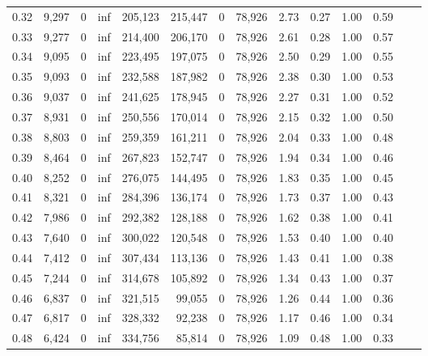 \begin{tabular}{rrrrrrrrrrrrrr}
0.32 &  9,297 &      0 &      inf &  205,123 &  215,447 &       0 &  78,926 &  2.73 &  0.27 &  1.00 &      0.59 \\
0.33 &  9,277 &      0 &      inf &  214,400 &  206,170 &       0 &  78,926 &  2.61 &  0.28 &  1.00 &      0.57 \\
0.34 &  9,095 &      0 &      inf &  223,495 &  197,075 &       0 &  78,926 &  2.50 &  0.29 &  1.00 &      0.55 \\
0.35 &  9,093 &      0 &      inf &  232,588 &  187,982 &       0 &  78,926 &  2.38 &  0.30 &  1.00 &      0.53 \\
0.36 &  9,037 &      0 &      inf &  241,625 &  178,945 &       0 &  78,926 &  2.27 &  0.31 &  1.00 &      0.52 \\
0.37 &  8,931 &      0 &      inf &  250,556 &  170,014 &       0 &  78,926 &  2.15 &  0.32 &  1.00 &      0.50 \\
0.38 &  8,803 &      0 &      inf &  259,359 &  161,211 &       0 &  78,926 &  2.04 &  0.33 &  1.00 &      0.48 \\
0.39 &  8,464 &      0 &      inf &  267,823 &  152,747 &       0 &  78,926 &  1.94 &  0.34 &  1.00 &      0.46 \\
0.40 &  8,252 &      0 &      inf &  276,075 &  144,495 &       0 &  78,926 &  1.83 &  0.35 &  1.00 &      0.45 \\
0.41 &  8,321 &      0 &      inf &  284,396 &  136,174 &       0 &  78,926 &  1.73 &  0.37 &  1.00 &      0.43 \\
0.42 &  7,986 &      0 &      inf &  292,382 &  128,188 &       0 &  78,926 &  1.62 &  0.38 &  1.00 &      0.41 \\
0.43 &  7,640 &      0 &      inf &  300,022 &  120,548 &       0 &  78,926 &  1.53 &  0.40 &  1.00 &      0.40 \\
0.44 &  7,412 &      0 &      inf &  307,434 &  113,136 &       0 &  78,926 &  1.43 &  0.41 &  1.00 &      0.38 \\
0.45 &  7,244 &      0 &      inf &  314,678 &  105,892 &       0 &  78,926 &  1.34 &  0.43 &  1.00 &      0.37 \\
0.46 &  6,837 &      0 &      inf &  321,515 &   99,055 &       0 &  78,926 &  1.26 &  0.44 &  1.00 &      0.36 \\
0.47 &  6,817 &      0 &      inf &  328,332 &   92,238 &       0 &  78,926 &  1.17 &  0.46 &  1.00 &      0.34 \\
0.48 &  6,424 &      0 &      inf &  334,756 &   85,814 &       0 &  78,926 &  1.09 &  0.48 &  1.00 &      0.33 \\

\end{tabular}
